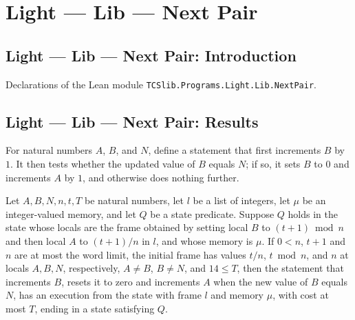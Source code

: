 \section{Light --- Lib --- Next Pair}
\subsection*{Light --- Lib --- Next Pair: Introduction}

Declarations of the Lean module \texttt{TCSlib.Programs.Light.Lib.NextPair}.

\subsection*{Light --- Lib --- Next Pair: Results}

\begin{definition}
\label{Light.nextPair}
\leanok
{}
For natural numbers $A$, $B$, and $N$, define a statement that first increments $B$ by
$1$. It then tests whether the updated value of $B$ equals $N$; if so, it sets $B$ to
$0$ and increments $A$ by $1$, and otherwise does nothing further.
\end{definition}

\begin{theorem}
\label{Light.Ends.nextPair}
\leanok
{}
Let $A,B,N,n,t,T$ be natural numbers, let $l$ be a list of integers, let $\mu$ be an
integer-valued memory, and let $Q$ be a state predicate. Suppose $Q$ holds in the state
whose locals are the frame obtained by setting local $B$ to $(t+1)\bmod n$ and then
local $A$ to $(t+1)/n$ in $l$, and whose memory is $\mu$. If $0<n$, $t+1$ and $n$ are at
most the word limit, the initial frame has values $t/n$, $t\bmod n$, and $n$ at locals
$A,B,N$, respectively, $A\ne B$, $B\ne N$, and $14\le T$, then the statement that
increments $B$, resets it to zero and increments $A$ when the new value of $B$ equals
$N$, has an execution from the state with frame $l$ and memory $\mu$, with cost at most
$T$, ending in a state satisfying $Q$.
\end{theorem}
